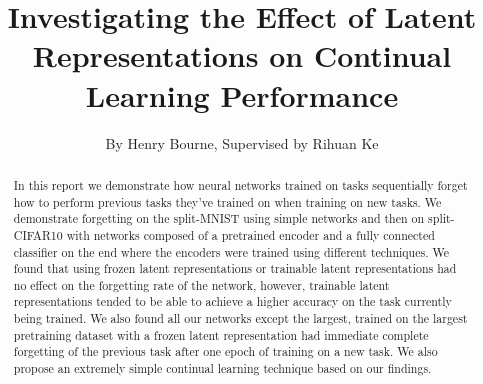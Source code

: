 \documentclass[a4paper]{article}
\title{Investigating the Effect of Latent Representations on Continual Learning Performance}
\author{By Henry Bourne, Supervised by Rihuan Ke}
\date{}
\begin{document}
\maketitle


\begin{abstract}
    In this report we demonstrate how neural networks trained on tasks sequentially forget how to perform previous tasks they've trained on when training on new tasks. We demonstrate forgetting on the split-MNIST using simple networks and then on split-CIFAR10 with networks composed of a pretrained encoder and a fully connected classifier on the end where the encoders were trained using different techniques. We found that using frozen latent representations or trainable latent representations had no effect on the forgetting rate of the network, however, trainable latent representations tended to be able to achieve a higher accuracy on the task currently being trained. We also found all our networks except the largest, trained on the largest pretraining dataset with a frozen latent representation had immediate complete forgetting of the previous task after one epoch of training on a new task. We also propose an extremely simple continual learning technique based on our findings.  
\end{abstract}


\FloatBarrier

\FloatBarrier

\FloatBarrier

\FloatBarrier

\FloatBarrier

\FloatBarrier
\small



\end{document}
